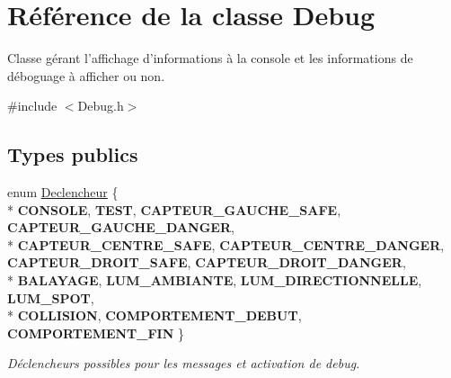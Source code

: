 \hypertarget{class_debug}{\section{Référence de la classe Debug}
\label{class_debug}
}


Classe gérant l'affichage d'informations à la console et les informations de déboguage à afficher ou non.  




{\ttfamily \#include $<$Debug.\-h$>$}

\subsection*{Types publics}
\begin{DoxyCompactItemize}
\item 
enum \hyperlink{class_debug_afd6ed3c50c08d0a7830cd5253b4ab8b6}{Declencheur} \{ \\*
{\bfseries C\-O\-N\-S\-O\-L\-E}, 
{\bfseries T\-E\-S\-T}, 
{\bfseries C\-A\-P\-T\-E\-U\-R\-\_\-\-G\-A\-U\-C\-H\-E\-\_\-\-S\-A\-F\-E}, 
{\bfseries C\-A\-P\-T\-E\-U\-R\-\_\-\-G\-A\-U\-C\-H\-E\-\_\-\-D\-A\-N\-G\-E\-R}, 
\\*
{\bfseries C\-A\-P\-T\-E\-U\-R\-\_\-\-C\-E\-N\-T\-R\-E\-\_\-\-S\-A\-F\-E}, 
{\bfseries C\-A\-P\-T\-E\-U\-R\-\_\-\-C\-E\-N\-T\-R\-E\-\_\-\-D\-A\-N\-G\-E\-R}, 
{\bfseries C\-A\-P\-T\-E\-U\-R\-\_\-\-D\-R\-O\-I\-T\-\_\-\-S\-A\-F\-E}, 
{\bfseries C\-A\-P\-T\-E\-U\-R\-\_\-\-D\-R\-O\-I\-T\-\_\-\-D\-A\-N\-G\-E\-R}, 
\\*
{\bfseries B\-A\-L\-A\-Y\-A\-G\-E}, 
{\bfseries L\-U\-M\-\_\-\-A\-M\-B\-I\-A\-N\-T\-E}, 
{\bfseries L\-U\-M\-\_\-\-D\-I\-R\-E\-C\-T\-I\-O\-N\-N\-E\-L\-L\-E}, 
{\bfseries L\-U\-M\-\_\-\-S\-P\-O\-T}, 
\\*
{\bfseries C\-O\-L\-L\-I\-S\-I\-O\-N}, 
{\bfseries C\-O\-M\-P\-O\-R\-T\-E\-M\-E\-N\-T\-\_\-\-D\-E\-B\-U\-T}, 
{\bfseries C\-O\-M\-P\-O\-R\-T\-E\-M\-E\-N\-T\-\_\-\-F\-I\-N}
 \}
\begin{DoxyCompactList}\small\item\em Déclencheurs possibles pour les messages et activation de debug. \end{DoxyCompactList}\end{DoxyCompactItemize}
